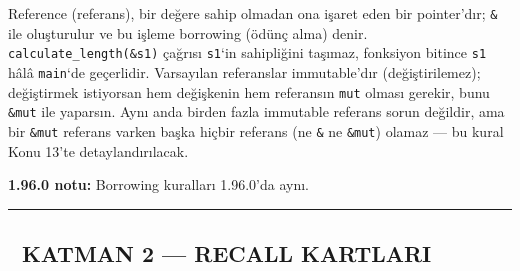 \documentclass[12pt,a4paper]{article}
\begin{document}
Reference (referans), bir değere sahip olmadan ona işaret eden bir pointer'dır; \texttt{\&} ile oluşturulur ve bu işleme borrowing (ödünç alma) denir. \texttt{calculate\_length(\&s1)} çağrısı \texttt{s1}`in sahipliğini taşımaz, fonksiyon bitince \texttt{s1} hâlâ \texttt{main}`de geçerlidir. Varsayılan referanslar immutable'dır (değiştirilemez); değiştirmek istiyorsan hem değişkenin hem referansın \texttt{mut} olması gerekir, bunu \texttt{\&mut} ile yaparsın. Aynı anda birden fazla immutable referans sorun değildir, ama bir \texttt{\&mut} referans varken başka hiçbir referans (ne \texttt{\&} ne \texttt{\&mut}) olamaz --- bu kural Konu 13'te detaylandırılacak.

\textbf{1.96.0 notu:} Borrowing kuralları 1.96.0'da aynı.

\begin{center}\rule{0.5\linewidth}{0.5pt}\end{center}

\subsection{🔵 KATMAN 2 --- RECALL KARTLARI}\label{katman-2-—-recall-kartlari-11}
\end{document}
